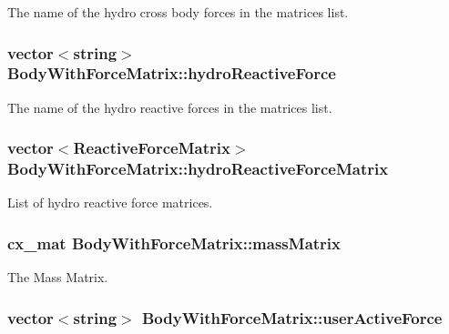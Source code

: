 The name of the hydro cross body forces in the matrices list. \hypertarget{class_body_with_force_matrix_ade2cce8108c19527e229f960b7bf7cd1}{
\subsubsection[{hydro\-Reactive\-Force}]{\setlength{\rightskip}{0pt plus 5cm}vector$<$string$>$ Body\-With\-Force\-Matrix\-::hydro\-Reactive\-Force}}\label{class_body_with_force_matrix_ade2cce8108c19527e229f960b7bf7cd1}
The name of the hydro reactive forces in the matrices list. \hypertarget{class_body_with_force_matrix_ab9be7a7eb8a4772ca011586590cfcbed}{
\subsubsection[{hydro\-Reactive\-Force\-Matrix}]{\setlength{\rightskip}{0pt plus 5cm}vector$<${\bf Reactive\-Force\-Matrix}$>$ Body\-With\-Force\-Matrix\-::hydro\-Reactive\-Force\-Matrix}}\label{class_body_with_force_matrix_ab9be7a7eb8a4772ca011586590cfcbed}
List of hydro reactive force matrices. \hypertarget{class_body_with_force_matrix_a3b07fb8ac7d58c1ed2b642676e51de6f}{
\subsubsection[{mass\-Matrix}]{\setlength{\rightskip}{0pt plus 5cm}cx\-\_\-mat Body\-With\-Force\-Matrix\-::mass\-Matrix}}\label{class_body_with_force_matrix_a3b07fb8ac7d58c1ed2b642676e51de6f}
The Mass Matrix. \hypertarget{class_body_with_force_matrix_adff7e3220bdcf4e367a5626afad29572}{
\subsubsection[{user\-Active\-Force}]{\setlength{\rightskip}{0pt plus 5cm}vector$<$string$>$ Body\-With\-Force\-Matrix\-::user\-Active\-Force}}\label{class_body_with_force_matrix_adff7e3220bdcf4e367a5626afad29572}
